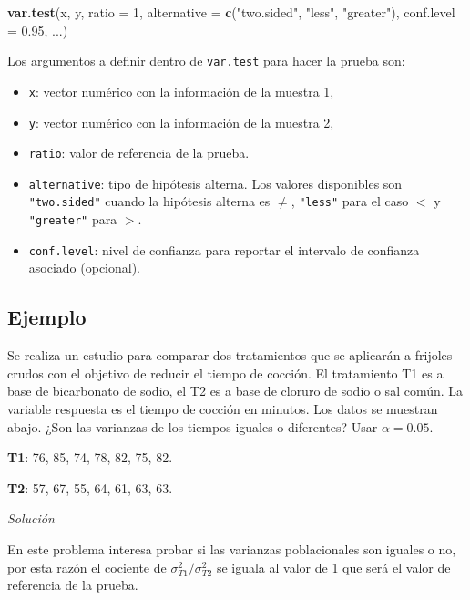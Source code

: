 \documentclass[10pt,]{krantz}
\makeatletter
\newenvironment{Shaded}{\begin{snugshade}}{\end{snugshade}}
\newcommand{\KeywordTok}[1]{\textcolor[rgb]{0.13,0.29,0.53}{\textbf{#1}}}
\newcommand{\DataTypeTok}[1]{\textcolor[rgb]{0.13,0.29,0.53}{#1}}
\newcommand{\DecValTok}[1]{\textcolor[rgb]{0.00,0.00,0.81}{#1}}
\newcommand{\FloatTok}[1]{\textcolor[rgb]{0.00,0.00,0.81}{#1}}
\newcommand{\StringTok}[1]{\textcolor[rgb]{0.31,0.60,0.02}{#1}}
\newcommand{\NormalTok}[1]{#1}
\providecommand{\tightlist}{%
  \setlength{\itemsep}{0pt}\setlength{\parskip}{0pt}}
\newenvironment{kframe}{%
\medskip{}
\setlength{\fboxsep}{.8em}
 \def\at@end@of@kframe{}%
 \ifinner\ifhmode%
  \def\at@end@of@kframe{\end{minipage}}%
  \begin{minipage}{\columnwidth}%
 \fi\fi%
 \def\FrameCommand##1{\hskip\@totalleftmargin \hskip-\fboxsep
 \colorbox{shadecolor}{##1}\hskip-\fboxsep
     \hskip-\linewidth \hskip-\@totalleftmargin \hskip\columnwidth}%
 \MakeFramed {\advance\hsize-\width
   \@totalleftmargin\z@ \linewidth\hsize
   \@setminipage}}%
 {\par\unskip\endMakeFramed%
 \at@end@of@kframe}
\renewenvironment{Shaded}{\begin{kframe}}{\end{kframe}}
\makeatother
\begin{document}
\begin{Shaded}
\begin{Highlighting}[]
\KeywordTok{var.test}\NormalTok{(x, y, }\DataTypeTok{ratio =} \DecValTok{1}\NormalTok{,}
         \DataTypeTok{alternative =} \KeywordTok{c}\NormalTok{(}\StringTok{"two.sided"}\NormalTok{, }\StringTok{"less"}\NormalTok{, }\StringTok{"greater"}\NormalTok{),}
         \DataTypeTok{conf.level =} \FloatTok{0.95}\NormalTok{, ...)}
\end{Highlighting}
\end{Shaded}

Los argumentos a definir dentro de \texttt{var.test} para hacer la
prueba son:

\begin{itemize}
\tightlist
\item
  \texttt{x}: vector numérico con la información de la muestra 1,
\item
  \texttt{y}: vector numérico con la información de la muestra 2,
\item
  \texttt{ratio}: valor de referencia de la prueba.
\item
  \texttt{alternative}: tipo de hipótesis alterna. Los valores
  disponibles son \texttt{"two.sided"} cuando la hipótesis alterna es
  \(\neq\), \texttt{"less"} para el caso \(<\) y \texttt{"greater"} para
  \(>\).
\item
  \texttt{conf.level}: nivel de confianza para reportar el intervalo de
  confianza asociado (opcional).
\end{itemize}

\subsection*{Ejemplo}\label{ejemplo-68}


Se realiza un estudio para comparar dos tratamientos que se aplicarán a
frijoles crudos con el objetivo de reducir el tiempo de cocción. El
tratamiento T1 es a base de bicarbonato de sodio, el T2 es a base de
cloruro de sodio o sal común. La variable respuesta es el tiempo de
cocción en minutos. Los datos se muestran abajo. ¿Son las varianzas de
los tiempos iguales o diferentes? Usar \(\alpha=0.05\).

\textbf{T1}: 76, 85, 74, 78, 82, 75, 82.

\textbf{T2}: 57, 67, 55, 64, 61, 63, 63.

\emph{Solución}

En este problema interesa probar si las varianzas poblacionales son
iguales o no, por esta razón el cociente de
\(\sigma_{T1}^2 / \sigma_{T2}^2\) se iguala al valor de 1 que será el
valor de referencia de la prueba.
\end{document}
